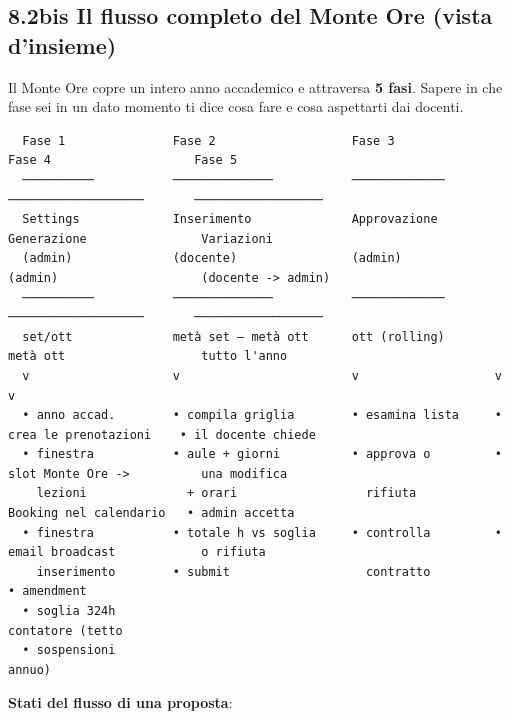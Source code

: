 \documentclass[11pt,a4paper]{article}
\begin{document}
\subsection{8.2bis Il flusso completo del Monte Ore (vista d'insieme)}


Il Monte Ore copre un intero anno accademico e attraversa \textbf{5 fasi}. Sapere in che fase sei in un dato momento ti dice cosa fare e cosa aspettarti dai docenti.

\begin{lstlisting}
  Fase 1               Fase 2                   Fase 3              Fase 4                    Fase 5
  ──────────           ──────────────           ─────────────       ───────────────────       ──────────────────
  Settings             Inserimento              Approvazione        Generazione                Variazioni
  (admin)              (docente)                (admin)             (admin)                    (docente -> admin)
  ──────────           ──────────────           ─────────────       ───────────────────       ──────────────────
  set/ott              metà set – metà ott      ott (rolling)       metà ott                   tutto l'anno
  v                    v                        v                   v                          v
  • anno accad.        • compila griglia        • esamina lista     • crea le prenotazioni    • il docente chiede
  • finestra           • aule + giorni          • approva o         • slot Monte Ore ->          una modifica
    lezioni              + orari                  rifiuta             Booking nel calendario   • admin accetta
  • finestra           • totale h vs soglia     • controlla         • email broadcast            o rifiuta
    inserimento        • submit                   contratto                                    • amendment
  • soglia 324h                                                                                  contatore (tetto
  • sospensioni                                                                                  annuo)
\end{lstlisting}

\textbf{Stati del flusso di una proposta}:
\end{document}
